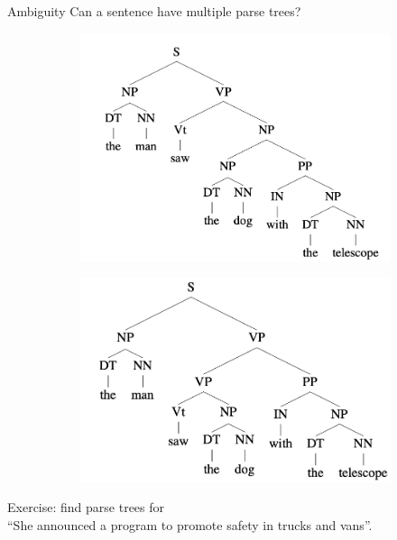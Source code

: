 \documentclass[usenames,dvipsnames,notes,11pt,aspectratio=169]{beamer}
\begin{document}
\begin{frame}
    {Ambiguity}
    Can a sentence have multiple parse trees?
    \begin{figure}
        \begin{subfigure}[b]{0.45\textwidth}
            \includegraphics[width=\textwidth]{figures/parse-1.png}
        \end{subfigure}
        \begin{subfigure}[b]{0.45\textwidth}
            \includegraphics[width=\textwidth]{figures/parse-2.png}
        \end{subfigure}
    \end{figure}

    Exercise: find parse trees for\\
    ``She announced a program to promote safety in trucks and vans''.
\end{frame}
\end{document}
